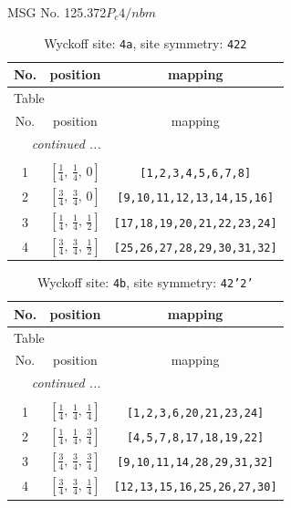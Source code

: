 \documentclass[fleqn,8pt]{jsarticle}
\begin{document}
\setcounter{MaxMatrixCols}{32}

\renewcommand{\tablename}{Table~}
\renewcommand{\figurename}{Figure~}
\begin{center}
\LARGE
MSG No. 125.372\quad$P_{c}4/nbm$
\end{center}
\renewcommand{\arraystretch}{1.2}
\begin{longtable}{ccc}
\caption{Wyckoff site: {\tt 4a}, site symmetry: {\tt 422}}
 \\
 \hline \hline
No. & position & mapping \\ \hline \endfirsthead

\multicolumn{2}{l}{\tablename\ \thetable{}} \\
 \hline \hline
No. & position & mapping \\ \hline \endhead

 \hline \hline
\multicolumn{2}{r}{\footnotesize\it continued ...} \\ \endfoot

 \hline \hline
\multicolumn{2}{r}{} \\ \endlastfoot

1 & $\left[ \frac{1}{4},\, \frac{1}{4},\, 0 \right]$ & {\tt [1,2,3,4,5,6,7,8]} \\ \hline
2 & $\left[ \frac{3}{4},\, \frac{3}{4},\, 0 \right]$ & {\tt [9,10,11,12,13,14,15,16]} \\ \hline
3 & $\left[ \frac{1}{4},\, \frac{1}{4},\, \frac{1}{2} \right]$ & {\tt [17,18,19,20,21,22,23,24]} \\ \hline
4 & $\left[ \frac{3}{4},\, \frac{3}{4},\, \frac{1}{2} \right]$ & {\tt [25,26,27,28,29,30,31,32]} \\
\end{longtable}
\renewcommand{\arraystretch}{1.2}
\begin{longtable}{ccc}
\caption{Wyckoff site: {\tt 4b}, site symmetry: {\tt 42'2'}}
 \\
 \hline \hline
No. & position & mapping \\ \hline \endfirsthead

\multicolumn{2}{l}{\tablename\ \thetable{}} \\
 \hline \hline
No. & position & mapping \\ \hline \endhead

 \hline \hline
\multicolumn{2}{r}{\footnotesize\it continued ...} \\ \endfoot

 \hline \hline
\multicolumn{2}{r}{} \\ \endlastfoot

1 & $\left[ \frac{1}{4},\, \frac{1}{4},\, \frac{1}{4} \right]$ & {\tt [1,2,3,6,20,21,23,24]} \\ \hline
2 & $\left[ \frac{1}{4},\, \frac{1}{4},\, \frac{3}{4} \right]$ & {\tt [4,5,7,8,17,18,19,22]} \\ \hline
3 & $\left[ \frac{3}{4},\, \frac{3}{4},\, \frac{3}{4} \right]$ & {\tt [9,10,11,14,28,29,31,32]} \\ \hline
4 & $\left[ \frac{3}{4},\, \frac{3}{4},\, \frac{1}{4} \right]$ & {\tt [12,13,15,16,25,26,27,30]} \\
\end{longtable}
\end{document}
